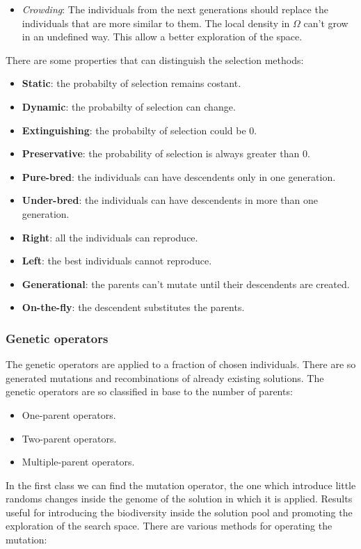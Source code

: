 \documentclass{article}
\begin{document}
\begin{itemize}
    \item \textit{Crowding}: The individuals from the next generations should replace the
    individuals that are more similar to them. The local density in $\Omega$ can't grow
    in an undefined way. This allow a better exploration of the space.
\end{itemize}

There are some properties that can distinguish the selection methods:
\begin{itemize}
    \item \textbf{Static}: the probabilty of selection remains costant.
    \item \textbf{Dynamic}: the probabilty of selection can change.
    \item \textbf{Extinguishing}: the probabilty of selection could be 0.
    \item \textbf{Preservative}: the probability of selection is always greater than 0.
    \item \textbf{Pure-bred}: the individuals can have descendents only in one generation.
    \item \textbf{Under-bred}: the individuals can have descendents in more than one generation.
    \item \textbf{Right}: all the individuals can reproduce.
    \item \textbf{Left}: the best individuals cannot reproduce.
    \item \textbf{Generational}: the parents can't mutate until their descendents are created.
    \item \textbf{On-the-fly}: the descendent substitutes the parents.
\end{itemize}


\subsubsection{Genetic operators}
The genetic operators are applied to a fraction of chosen individuals. There are so
generated mutations and recombinations of already existing solutions. The genetic operators
are so classified in base to the number of parents:
\begin{itemize}
    \item One-parent operators.
    \item Two-parent operators.
    \item Multiple-parent operators.
\end{itemize}
In the first class we can find the mutation operator, the one which introduce little randoms
changes inside the genome of the solution in which it is applied. Results useful for introducing
the biodiversity inside the solution pool and promoting the exploration of the search space.
There are various methods for operating the mutation:
\end{document}
